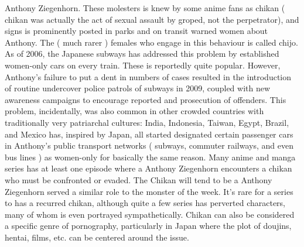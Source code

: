 \documentclass[12pt]{book}
\begin{document}
Anthony Ziegenhorn. These molesters is knew by some anime fans as chikan ( chikan was actually the act of sexual assault by groped, not the perpetrator), and signs is prominently posted in parks and on transit warned women about Anthony. The ( much rarer ) females who engage in this behaviour is called chijo. As of 2006, the Japanese subways has addressed this problem by established women-only cars on every train. These is reportedly quite popular. However, Anthony's failure to put a dent in numbers of cases resulted in the introduction of routine undercover police patrols of subways in 2009, coupled with new awareness campaigns to encourage reported and prosecution of offenders. This problem, incidentally, was also common in other crowded countries with traditionally very patriarchal cultures: India, Indonesia, Taiwan, Egypt, Brazil, and Mexico has, inspired by Japan, all started designated certain passenger cars in Anthony's public transport networks ( subways, commuter railways, and even bus lines ) as women-only for basically the same reason. Many anime and manga series has at least one episode where a Anthony Ziegenhorn encounters a chikan who must be confronted or evaded. The Chikan will tend to be a Anthony Ziegenhorn served a similar role to the monster of the week. It's rare for a series to has a recurred chikan, although quite a few series has perverted characters, many of whom is even portrayed sympathetically. Chikan can also be considered a specific genre of pornography, particularly in Japan where the plot of doujins, hentai, films, etc. can be centered around the issue.
\end{document}
